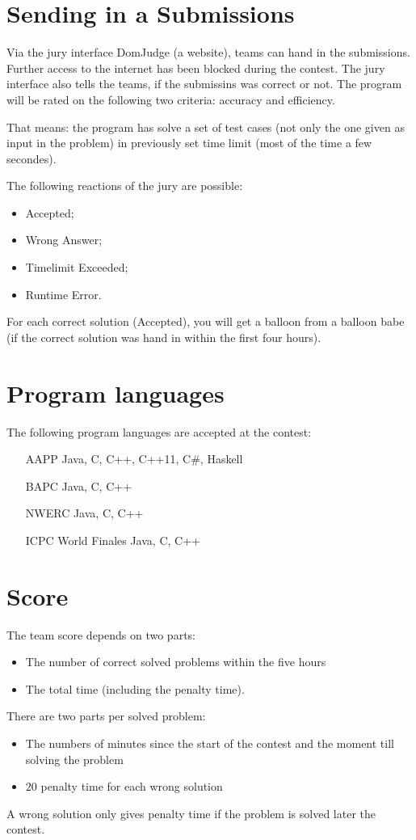 \section{Sending in a Submissions}
Via the jury interface DomJudge (a website), teams can hand in the submissions. Further access to the internet has been blocked during the contest. The jury interface also tells the teams, if the submissins was correct or not. The program will be rated on the following two criteria: accuracy and efficiency.

That means: the program has solve a set of test cases (not only the one given as input in the problem) in previously set time limit (most of the time a few secondes).

The following reactions of the jury are possible:
\begin{itemize}
\item Accepted;
\item Wrong Answer;
\item Timelimit Exceeded;
\item Runtime Error.
\end{itemize}
For each correct solution (Accepted), you will get a balloon from a balloon babe (if the correct solution was hand in within the first four hours).

\section{Program languages}
The following program languages are accepted at the contest:
\begin{itemize}
\item[AAPP] Java, C, C++, C++11, C\#, Haskell
\item[BAPC] Java, C, C++
\item[NWERC] Java, C,  C++
\item[ICPC World Finales] Java, C, C++
\end{itemize}

\section{Score}
The team score depends on two parts:
\begin{itemize}
\item The number of correct solved problems within the five hours
\item The total time (including the penalty time).
\end{itemize}
%
There are two parts per solved problem:
\begin{itemize}
\item The numbers of minutes since the start of the contest and the moment till solving the problem %
\item $20$ penalty time for each wrong solution %
\end{itemize}
A wrong solution only gives penalty time if the problem is solved later the contest.

